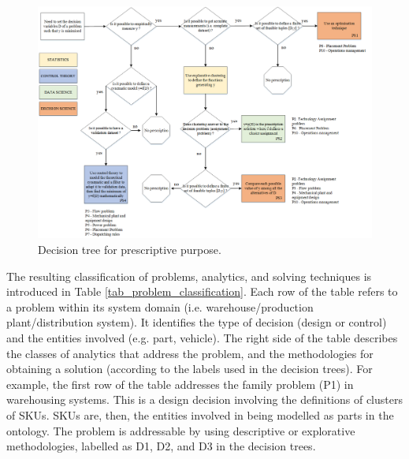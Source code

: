 \begin{landscape}
\thispagestyle{empty}
\begin{figure}[hbt!]
\centering
\includegraphics[width=1.5\textwidth]{SectionIntroduction/dataDrivenDecisions_fig/fig_prescribe_tree.png}
\captionsetup{type=figure}
\caption{Decision tree for prescriptive purpose.}
\label{fig_prescribe_tree}
\vfill
\end{figure}
\end{landscape}



The resulting classification of problems, analytics, and solving techniques is introduced in Table \ref{tab_problem_classification}. Each row of the table refers to a problem within its system domain (i.e. warehouse/production plant/distribution system). It identifies the type of decision (design or control) and the entities involved (e.g. part, vehicle). The right side of the table describes the classes of analytics that address the problem, and the methodologies for obtaining a solution (according to the labels used in the decision trees). For example, the first row of the table addresses the family problem (P1) in warehousing systems. This is a design decision involving the definitions of clusters of SKUs. SKUs are, then, the entities involved in being modelled as parts in the ontology. The problem is addressable by using descriptive or explorative methodologies, labelled as D1, D2, and D3 in the decision trees.


